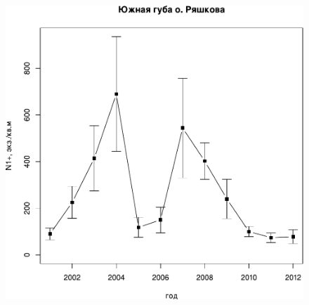 \begin{figure}[p]
\begin{minipage}[b]{.49\linewidth}
\begin{center}
	\end{center}
	\end{minipage}


	\begin{minipage}[b]{.49\linewidth}
	\begin{center}
		\includegraphics[width=\linewidth]{../White_Sea/Ryashkov_YuG/YuG_N_oneyear1.pdf}
	\end{center}
	\end{minipage}
%
	\hfil %
%
	\begin{minipage}[b]{.49\linewidth}
	\begin{center}

\end{center}
\end{minipage}
\end{figure}
